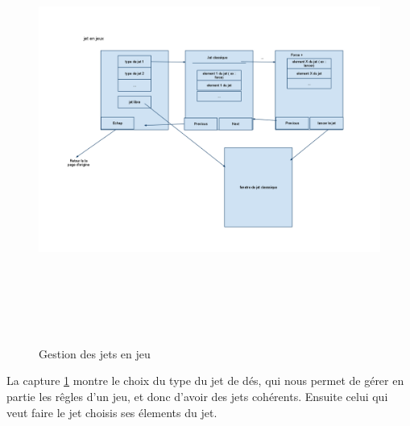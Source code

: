 \documentclass[11pt,a4paper]{article}
\begin{document}
\begin{figure}[h]
  	
  		\includegraphics[height=14cm,width=15cm]{image/screen4.png}
  		\caption{Gestion des jets en jeu}
  		\label{screen4}
\end{figure}

La capture \ref{screen4} montre le choix du type du jet de dés, qui nous permet de gérer en partie
les rêgles d'un jeu, et donc d'avoir des jets cohérents. Ensuite celui qui veut faire le jet
choisis ses élements du jet.
\end{document}
